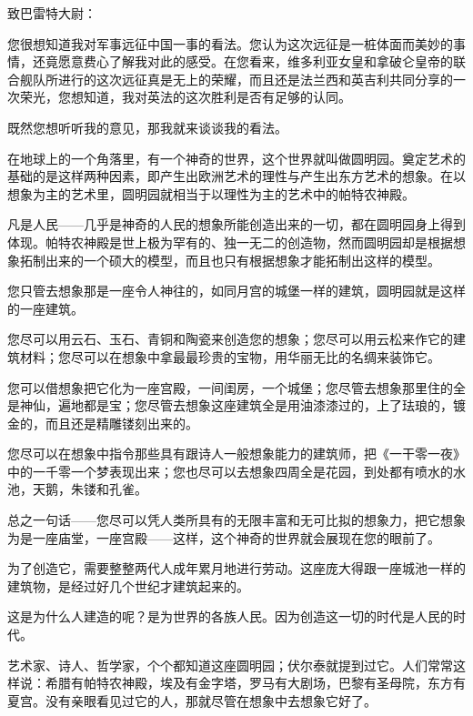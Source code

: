 \documentclass[12pt,UTF-8,openany]{ctexbook}
\begin{document}
\begin{large}
    
    \noindent 致巴雷特大尉：
    
    \vspace{24pt}
    
    您很想知道我对军事远征中国一事的看法。您认为这次远征是一桩体面而美妙的事情，还竟愿意费心了解我对此的感受。在您看来，维多利亚女皇和拿破仑皇帝的联合舰队所进行的这次远征真是无上的荣耀，而且还是法兰西和英吉利共同分享的一次荣光，您想知道，我对英法的这次胜利是否有足够的认同。
    
    既然您想听听我的意见，那我就来谈谈我的看法。
    
    在地球上的一个角落里，有一个神奇的世界，这个世界就叫做圆明园。奠定艺术的基础的是这样两种因素，即产生出欧洲艺术的理性与产生出东方艺术的想象。在以想象为主的艺术里，圆明园就相当于以理性为主的艺术中的帕特农神殿。
    
    凡是人民——几乎是神奇的人民的想象所能创造出来的一切，都在圆明园身上得到体现。帕特农神殿是世上极为罕有的、独一无二的创造物，然而圆明园却是根据想象拓制出来的一个硕大的模型，而且也只有根据想象才能拓制出这样的模型。
    
    您只管去想象那是一座令人神往的，如同月宫的城堡一样的建筑，圆明园就是这样的一座建筑。
    
    您尽可以用云石、玉石、青铜和陶瓷来创造您的想象；您尽可以用云松来作它的建筑材料；您尽可以在想象中拿最最珍贵的宝物，用华丽无比的名绸来装饰它。
    
    您可以借想象把它化为一座宫殿，一间闺房，一个城堡；您尽管去想象那里住的全是神仙，遍地都是宝；您尽管去想象这座建筑全是用油漆漆过的，上了珐琅的，镀金的，而且还是精雕镂刻出来的。
    
    您尽可以在想象中指令那些具有跟诗人一般想象能力的建筑师，把《一干零一夜》中的一千零一个梦表现出来；您也尽可以去想象四周全是花园，到处都有喷水的水池，天鹅，朱镂和孔雀。
    
    总之一句话——您尽可以凭人类所具有的无限丰富和无可比拟的想象力，把它想象为是一座庙堂，一座宫殿——这样，这个神奇的世界就会展现在您的眼前了。
    
    为了创造它，需要整整两代人成年累月地进行劳动。这座庞大得跟一座城池一样的建筑物，是经过好几个世纪才建筑起来的。
    
    这是为什么人建造的呢？是为世界的各族人民。因为创造这一切的时代是人民的时代。
    
    艺术家、诗人、哲学家，个个都知道这座圆明园；伏尔泰就提到过它。人们常常这样说：希腊有帕特农神殿，埃及有金字塔，罗马有大剧场，巴黎有圣母院，东方有夏宫。没有亲眼看见过它的人，那就尽管在想象中去想象它好了。
    

\end{large}
\end{document}
